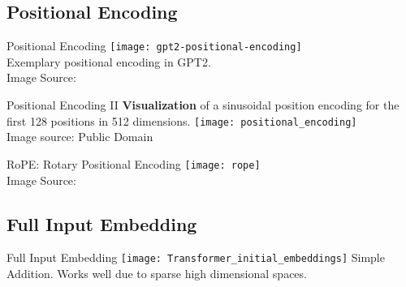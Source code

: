 \subsection{Positional Encoding}

\begin{frame}[c]{Positional Encoding}
    \texttt{[image: gpt2-positional-encoding]} \\
    \large
    Exemplary positional encoding in GPT2. \\
    \normalsize
    Image Source: \cite{alammar_illustrated_2019}
\end{frame}

\begin{frame}[c]{Positional Encoding II}
    \large
    \textbf{Visualization} of a sinusoidal position encoding for the first 128 positions in 512 dimensions.
    \newline
    \newline
    \texttt{[image: positional\_encoding]} \\
    \normalsize
    Image source: Public Domain
\end{frame}

\begin{frame}[c]{RoPE: Rotary Positional Encoding}
    \texttt{[image: rope]} \\
    Image Source: \cite{su_roformer_2022}
\end{frame}



\subsection{Full Input Embedding}
\begin{frame}[c]{Full Input Embedding}
    \texttt{[image: Transformer\_initial\_embeddings]}
    \large
    Simple Addition. Works well due to sparse high dimensional spaces.
\end{frame}


